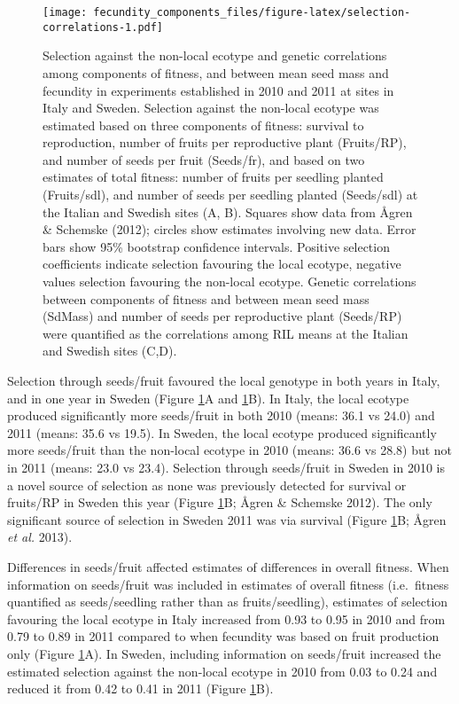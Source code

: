 \documentclass[]{article}
\begin{document}
\begin{figure}
\centering
\texttt{[image: fecundity\_components\_files/figure-latex/selection-correlations-1.pdf]}
\caption{\label{fig:selection-correlations}Selection against the non-local ecotype and genetic correlations among components of fitness, and between mean seed mass and fecundity in experiments established in 2010 and 2011 at sites in Italy and Sweden. Selection against the non-local ecotype was estimated based on three components of fitness: survival to reproduction, number of fruits per reproductive plant (Fruits/RP), and number of seeds per fruit (Seeds/fr), and based on two estimates of total fitness: number of fruits per seedling planted (Fruits/sdl), and number of seeds per seedling planted (Seeds/sdl) at the Italian and Swedish sites (A, B). Squares show data from Ågren \& Schemske (2012); circles show estimates involving new data. Error bars show 95\% bootstrap confidence intervals. Positive selection coefficients indicate selection favouring the local ecotype, negative values selection favouring the non-local ecotype. Genetic correlations between components of fitness and between mean seed mass (SdMass) and number of seeds per reproductive plant (Seeds/RP) were quantified as the correlations among RIL means at the Italian and Swedish sites (C,D).}
\end{figure}

Selection through seeds/fruit favoured the local genotype in both years in Italy, and in one year in Sweden (Figure \ref{fig:selection-correlations}A and \ref{fig:selection-correlations}B).
In Italy, the local ecotype produced significantly more seeds/fruit in both 2010
(means:
36.1
vs
24.0)
and 2011 (means:
35.6
vs
19.5).
In Sweden, the local ecotype produced significantly more seeds/fruit than the non-local ecotype in 2010 (means:
36.6
vs
28.8)
but not in 2011 (means:
23.0
vs
23.4).
Selection through seeds/fruit in Sweden in 2010 is a novel source of selection as none was previously detected for survival or fruits/RP in Sweden this year (Figure \ref{fig:selection-correlations}B; Ågren \& Schemske 2012). The only significant source of selection in Sweden 2011 was via survival (Figure \ref{fig:selection-correlations}B; Ågren \emph{et al.} 2013).

Differences in seeds/fruit affected estimates of differences in overall fitness. When information on seeds/fruit was included in estimates of overall fitness (i.e.~fitness quantified as seeds/seedling rather than as fruits/seedling), estimates of selection favouring the local ecotype in Italy increased from
0.93
to
0.95
in 2010 and from
0.79
to
0.89
in 2011 compared to when fecundity was based on fruit production only (Figure \ref{fig:selection-correlations}A). In Sweden, including information on seeds/fruit increased the estimated selection against the non-local ecotype in 2010 from
0.03
to
0.24
and reduced it from
0.42
to
0.41
in 2011 (Figure \ref{fig:selection-correlations}B).
\end{document}

